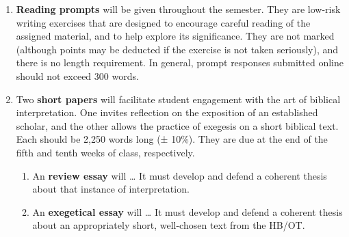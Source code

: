 \documentclass[titlepage]{article}
\begin{document}
\begin{enumerate}

	\item \textbf{Reading prompts} will be given throughout the
	semester. They are low-risk writing exercises that are designed to
	encourage careful reading of the assigned material, and to help
	explore its significance. They are not marked (although points may
	be deducted if the exercise is not taken seriously), and there is no
	length requirement. In general, prompt responses submitted online
	should not exceed 300 words.


	\item Two \textbf{short papers} will facilitate student engagement
	with the art of biblical interpretation. One invites reflection on
	the exposition of an established scholar, and the other allows the
	practice of exegesis on a short biblical text. Each should be 2,250
	words long (± 10\%). They are due at the end of the fifth and tenth
	weeks of class, respectively.

	\begin{enumerate}

		\item An \textbf{review essay} will …
		It must develop and defend a coherent thesis about that instance
		of interpretation.

		\item An \textbf{exegetical essay} will … It must develop and
		defend a coherent thesis about an appropriately short,
		well-chosen text from the HB/OT.

	\end{enumerate}


\end{enumerate}
\end{document}
